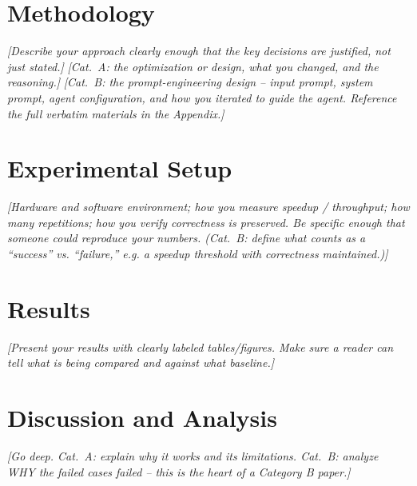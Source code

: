 \documentclass[conference]{IEEEtran}
\newcommand{\guide}[1]{{\color{gray}\textit{[#1]}}}
\begin{document}
\section{Methodology}
\guide{Describe your approach clearly enough that the key decisions are
justified, not just stated.}
\guide{Cat.~A: the optimization or design, what you changed, and the reasoning.}
\guide{Cat.~B: the prompt-engineering design -- input prompt, system prompt,
agent configuration, and how you iterated to guide the agent. Reference the full
verbatim materials in the Appendix.}

\section{Experimental Setup}
\guide{Hardware and software environment; how you measure speedup / throughput;
how many repetitions; how you verify correctness is preserved. Be specific
enough that someone could reproduce your numbers. (Cat.~B: define what counts as
a ``success'' vs. ``failure,'' e.g. a speedup threshold with correctness
maintained.)}

\section{Results}
\guide{Present your results with clearly labeled tables/figures. Make sure a
reader can tell what is being compared and against what baseline.}


\section{Discussion and Analysis}
\guide{Go deep. Cat.~A: explain why it works and its limitations. Cat.~B:
analyze WHY the failed cases failed -- this is the heart of a Category B paper.}
\end{document}
